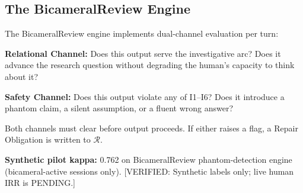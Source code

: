 \documentclass{article}
\newcommand{\verified}[1]{\textcolor{verifiedgreen}{[VERIFIED: #1]}}
\begin{document}
\subsection{The BicameralReview Engine}

The BicameralReview engine implements dual-channel evaluation per turn:

\textbf{Relational Channel:} Does this output serve the investigative arc?
Does it advance the research question without degrading the human's capacity
to think about it?

\textbf{Safety Channel:} Does this output violate any of I1--I6? Does it
introduce a phantom claim, a silent assumption, or a fluent wrong answer?

Both channels must clear before output proceeds. If either raises a flag, a
Repair Obligation is written to $\mathcal{R}$.

\textbf{Synthetic pilot kappa:} 0.762 on BicameralReview phantom-detection
engine (bicameral-active sessions only). \verified{Synthetic labels only; live
human IRR is PENDING.}
\end{document}
